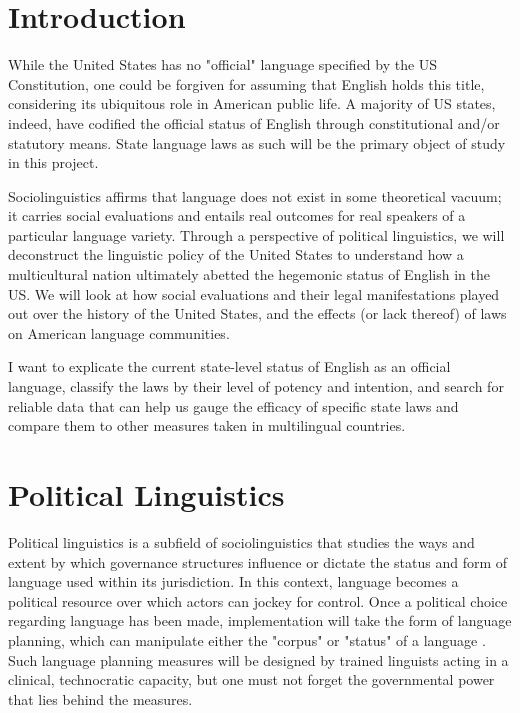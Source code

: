 \documentclass{article}
\begin{document}
\section*{Introduction}

While the United States has no "official" language specified by the US
Constitution, one could be forgiven for assuming that English holds this title,
considering its ubiquitous role in American public life. A majority of US
states, indeed, have codified the official status of English through
constitutional and/or statutory means. State language laws as such will be the
primary object of study in this project.

Sociolinguistics affirms that language does not exist in some theoretical
vacuum; it carries social evaluations and entails real outcomes for real
speakers of a particular language variety. Through a perspective of political
linguistics, we will deconstruct the linguistic policy of the United States to
understand how a multicultural nation ultimately abetted the hegemonic status of
English in the US.  We will look at how social evaluations and their legal
manifestations played out over the history of the United States, and the effects
(or lack thereof) of laws on American language communities.

I want to explicate the current state-level status of English as an official
language, classify the laws by their level of potency and intention, and search
for reliable data that can help us gauge the efficacy of specific state laws and
compare them to other measures taken in multilingual countries.

\section*{Political Linguistics}

Political linguistics is a subfield of sociolinguistics that studies the ways
and extent by which governance structures influence or dictate the status and
form of language used within its jurisdiction. In this context, language becomes
a political resource over which actors can jockey for control. Once a political
choice regarding language has been made, implementation will take the form of
language planning, which can manipulate either the "corpus" or "status" of a
language \parencite{Calvet96}. Such language planning measures will be designed
by trained linguists acting in a clinical, technocratic capacity, but one must
not forget the governmental power that lies behind the measures.
\end{document}
